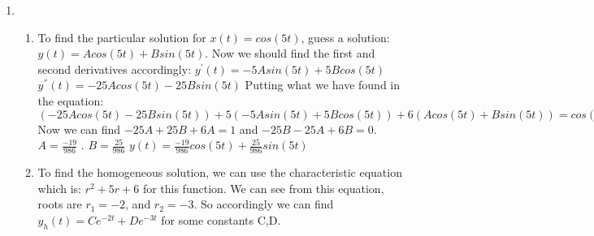 \documentclass[10pt,a4paper, margin=1in]{article}
\begin{document}
\begin{enumerate}
\begin{enumerate}
        \vspace{2pt}\linebreak
        \vspace{2pt}\linebreak
        \vspace{2pt}\linebreak
        \vspace{2pt}\linebreak
        \vspace{2pt}\linebreak
        \vspace{2pt}\linebreak
        \vspace{2pt}\linebreak
    \end{enumerate}

\item %
    \begin{enumerate}
    \item To find the particular solution for $x(t)=cos(5t)$, guess a solution: $y(t)= Acos(5t)+Bsin(5t)$. Now we should find the first and second derivatives accordingly: \newline
    $y^{'}(t)= -5Asin(5t)+5Bcos(5t)$\newline
    $y^{''}(t)= -25Acos(5t)-25Bsin(5t)$\newline
    Putting what we have found in the equation: $(-25Acos(5t)-25Bsin(5t)) + 5(-5Asin(5t)+5Bcos(5t)) + 6(Acos(5t)+Bsin(5t)) =cos(5t) $ \newline
    Now we can find $-25A+25B+6A=1$ and $-25B-25A+6B=0$. $A=\frac{-19}{986}$ . $B=\frac{25}{986}$   \newline
    $y(t)= \frac{-19}{986}cos(5t)+ \frac{25}{986}sin(5t)$
    
    
     
    
    \item To find the homogeneous solution, we can use the characteristic equation which is: \newline
    $r^{2}+5r+6$ for this function. We can see from this equation, roots are $r_1=-2$, and $r_2=-3$. \newline
    So accordingly we can find $y_h(t)=Ce^{-2t} + De^{-3t}$ for some constants C,D.
    

\end{enumerate}
\end{enumerate}
\end{document}
